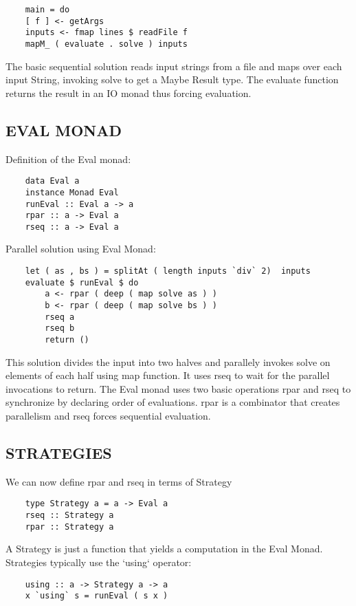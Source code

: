\documentclass[12pt,a4paper]{article}
\begin{document}
    \lstset{}
	\begin{lstlisting}
	main = do
	[ f ] <- getArgs
	inputs <- fmap lines $ readFile f
	mapM_ ( evaluate . solve ) inputs
    \end{lstlisting}
    
    The basic sequential solution reads input strings from a file and maps over each input String, invoking solve to get a Maybe Result type. The evaluate function returns the result in an IO monad thus forcing evaluation.

	\subsection{EVAL MONAD}
	Definition of the Eval monad:
	\lstset{}
	\begin{lstlisting}
	data Eval a
	instance Monad Eval
	runEval :: Eval a -> a
	rpar :: a -> Eval a
	rseq :: a -> Eval a
	\end{lstlisting}
	Parallel solution using Eval Monad:
	\lstset{}
	\begin{lstlisting}
	let ( as , bs ) = splitAt ( length inputs `div` 2) 	inputs
	evaluate $ runEval $ do
  		a <- rpar ( deep ( map solve as ) )
  		b <- rpar ( deep ( map solve bs ) )
  		rseq a
  		rseq b
  		return ()
  \end{lstlisting}
	
	This solution divides the input into two halves and parallely invokes solve on elements of each half using map function. It uses rseq to wait for the parallel invocations to return. The Eval monad uses two basic operations rpar and rseq to synchronize by declaring order of evaluations. rpar is a combinator that creates parallelism and rseq forces sequential evaluation.

	\subsection{STRATEGIES}
	We can now define rpar and rseq in terms of Strategy
	\lstset{}
	\begin{lstlisting}
	type Strategy a = a -> Eval a
	rseq :: Strategy a 
	rpar :: Strategy a
	\end{lstlisting}

A Strategy is just a function that yields a computation in the Eval Monad. Strategies typically use the `using` operator:

	\lstset{}
	\begin{lstlisting}
	using :: a -> Strategy a -> a 
	x `using` s = runEval ( s x )
	\end{lstlisting}
\end{document}

